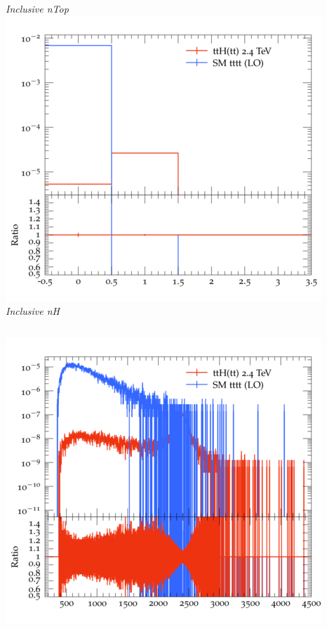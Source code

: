 \documentclass{beamer}
\begin{document}
\begin{frame}
\begin{columns}
\textit{\small Inclusive nTop}
\includegraphics[width=\textwidth]{../plots/ttH_2400/tttt_ttH/Inclusive_nH.png}\\
\textit{\small Inclusive nH}
\end{columns}
\begin{columns}
\includegraphics[width=\textwidth]{../plots/ttH_2400/tttt_ttH/Inclusive_InvM_ttbar12.png}\\

\end{columns}
\end{frame}
\end{document}

